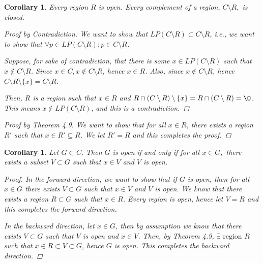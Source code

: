 \documentclass[11pt]{article}
\renewcommand{\emptyset}{\O}
\renewcommand{\_}[1]{\underline{ #1 }}
\newtheorem{corollary}[theorem]{Corollary}
\theoremstyle{definition}
\numberwithin{equation}{subsection}
\begin{document}
\begin{corollary}  Every region $R$ is open.  Every complement of a region, $C \setminus R,$ is closed.
\begin{proof}[Proof by Contradiction]
We want to show that $LP(C \setminus R) \subset C \setminus R$, i.e., we want to show that $\forall p \in LP(C \setminus R): p \in C \setminus R$. 

Suppose, for sake of contradiction, that there is some $x \in LP(C \setminus R)$ such that $x \not \in C \setminus R$. Since $x \in C, x \notin C \setminus R$, hence $x \in R$. Also, since $x \notin C \setminus R$, hence $C \setminus R \setminus \{x\} = C \setminus R$.

Then, $R$ is a region such that $x \in R$ and $R \cap (C \setminus R) \setminus \{x\} = R \cap (C \setminus R) = \emptyset$. This means $x \notin LP(C \setminus R)$, and this is a contradiction.

\renewcommand\qedsymbol{QED}
\end{proof}

\begin{proof}[Proof by Theorem 4.9]
We want to show that for all $x \in R$, there exists a region $R'$ such that $x \in R' \subseteq R$. We let $R' = R$ and this completes the proof.

\renewcommand\qedsymbol{QED}
\end{proof}

\end{corollary}


\begin{corollary} Let $G\subset C.$ Then $G$ is open if and only if for all $x\in G,$ there exists a subset $V\subset G$ such that $x\in V$ and $V$ is open. 
\begin{proof}
In the forward direction, we want to show that if $G$ is open, then for all $x \in G$ there exists $V \subset G$ such that $x \in V$ and $V$ is open. We know that there exists a region $R \subset G$ such that $x \in R$. Every region is open, hence let $V = R$ and this completes the forward direction.

In the backward direction, let $x \in G$, then by assumption we know that there exists $V \subset G$ such that $V$ is open and $x \in V$. Then, by Theorem 4.9, $\exists \text{ region }R$ such that $x \in R \subset V \subset G$, hence $G$ is open. This completes the backward direction.

\renewcommand\qedsymbol{QED}
\end{proof}
\end{corollary} 
\end{document}
